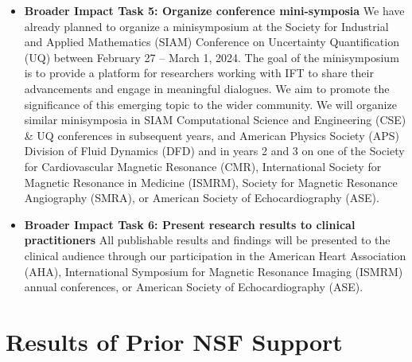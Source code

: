 \begin{itemize}[leftmargin=*]
\item \textbf{Broader Impact Task 5: Organize conference mini-symposia}
We have already planned to organize a minisymposium at the Society for Industrial and Applied Mathematics (SIAM) Conference on Uncertainty Quantification (UQ) between February 27 -- March 1, 2024.
The goal of the minisymposium is to provide a platform for researchers working with IFT to share their advancements and engage in meaningful dialogues.
We aim to promote the significance of this emerging topic to the wider community.
We will organize similar minisymposia in SIAM Computational Science and Engineering (CSE) \& UQ conferences in subsequent years, and American Physics Society (APS) Division of Fluid Dynamics (DFD) and in years 2 and 3 on one of the Society for Cardiovascular Magnetic Resonance (CMR), International Society for Magnetic Resonance in Medicine (ISMRM), Society for Magnetic Resonance Angiography (SMRA), or American Society of Echocardiography (ASE).

\item \textbf{Broader Impact Task 6: Present research results to clinical practitioners}
All publishable results and findings will be presented to the clinical audience through our participation in the American Heart Association (AHA), International Symposium for Magnetic Resonance Imaging (ISMRM) annual conferences, or American Society of Echocardiography (ASE).
\end{itemize}

\section{Results of Prior NSF Support}





